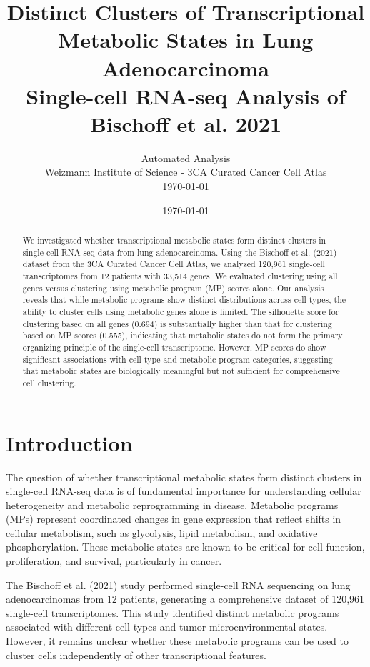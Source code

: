 \documentclass[11pt,a4paper]{article}
\title{\textbf{Distinct Clusters of Transcriptional Metabolic States in Lung Adenocarcinoma} \\
\small Single-cell RNA-seq Analysis of Bischoff et al. 2021}
\author{
    Automated Analysis \\
    Weizmann Institute of Science - 3CA Curated Cancer Cell Atlas \\
    \today
}
\date{\today}
\begin{document}
\maketitle

\begin{abstract}
We investigated whether transcriptional metabolic states form distinct clusters in single-cell RNA-seq data from lung adenocarcinoma. Using the Bischoff et al. (2021) dataset from the 3CA Curated Cancer Cell Atlas, we analyzed 120,961 single-cell transcriptomes from 12 patients with 33,514 genes. We evaluated clustering using all genes versus clustering using metabolic program (MP) scores alone. Our analysis reveals that while metabolic programs show distinct distributions across cell types, the ability to cluster cells using metabolic genes alone is limited. The silhouette score for clustering based on all genes (0.694) is substantially higher than that for clustering based on MP scores (0.555), indicating that metabolic states do not form the primary organizing principle of the single-cell transcriptome. However, MP scores do show significant associations with cell type and metabolic program categories, suggesting that metabolic states are biologically meaningful but not sufficient for comprehensive cell clustering.
\end{abstract}

\section{Introduction}

The question of whether transcriptional metabolic states form distinct clusters in single-cell RNA-seq data is of fundamental importance for understanding cellular heterogeneity and metabolic reprogramming in disease. Metabolic programs (MPs) represent coordinated changes in gene expression that reflect shifts in cellular metabolism, such as glycolysis, lipid metabolism, and oxidative phosphorylation. These metabolic states are known to be critical for cell function, proliferation, and survival, particularly in cancer.

The Bischoff et al. (2021) study \cite{bischoff2021single} performed single-cell RNA sequencing on lung adenocarcinomas from 12 patients, generating a comprehensive dataset of 120,961 single-cell transcriptomes. This study identified distinct metabolic programs associated with different cell types and tumor microenvironmental states. However, it remains unclear whether these metabolic programs can be used to cluster cells independently of other transcriptional features.
\end{document}
